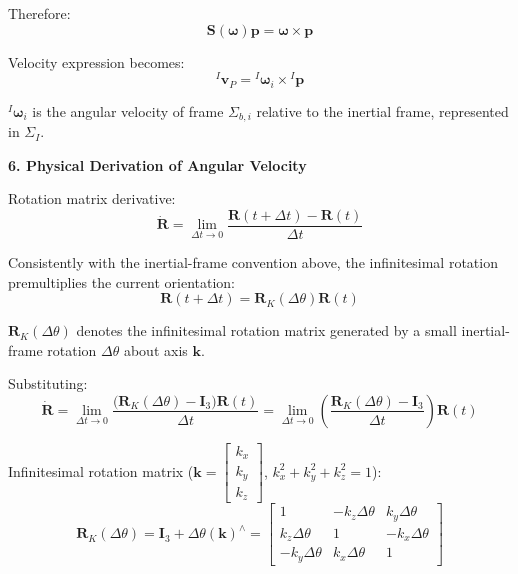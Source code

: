 \documentclass[12pt,a4paper]{report}
\newcommand{\newsymbols}[1]{\par\noindent{}#1\par\vspace{0.35em}}
\newcommand{\vect}[1]{\mathbf{#1}}
\newcommand{\mat}[1]{\mathbf{#1}}
\newcommand{\Frame}[1]{\Sigma_{#1}}
\newcommand{\skewmat}[1]{\left(#1\right)^\wedge}
\newcommand{\angvel}{\boldsymbol{\omega}}
\begin{document}
Therefore:
\begin{equation}
\mat{S}(\angvel)\vect{p} = \angvel \times \vect{p}
\end{equation}

Velocity expression becomes:
\begin{equation}
{}^{I}\vect{v}_{P}
=
{}^{I}\angvel_{i} \times {}^{I}\vect{p}
\end{equation}
\newsymbols{${}^{I}\angvel_{i}$ is the angular velocity of frame $\Frame{b,i}$ relative to the inertial frame, represented in $\Frame{I}$.}

\textbf{6. Physical Derivation of Angular Velocity}

Rotation matrix derivative:
\begin{equation}
\dot{\mat{R}}
=
\lim_{\Delta t \to 0}
\frac{\mat{R}(t+\Delta t) - \mat{R}(t)}{\Delta t}
\end{equation}

Consistently with the inertial-frame convention above, the infinitesimal rotation premultiplies the current orientation:
\begin{equation}
\mat{R}(t+\Delta t) = \mat{R}_{K}(\Delta\theta)\mat{R}(t)
\end{equation}
\newsymbols{$\mat{R}_{K}(\Delta\theta)$ denotes the infinitesimal rotation matrix generated by a small inertial-frame rotation $\Delta\theta$ about axis $\vect{k}$.}

Substituting:
\begin{equation}
\dot{\mat{R}}
=
\lim_{\Delta t \to 0}
\frac{\bigl(\mat{R}_{K}(\Delta\theta) - \mat{I}_{3}\bigr)\mat{R}(t)}{\Delta t}
=
\lim_{\Delta t \to 0}
\left(
\frac{\mat{R}_{K}(\Delta\theta) - \mat{I}_{3}}{\Delta t}
\right)\mat{R}(t)
\end{equation}

Infinitesimal rotation matrix ($\vect{k} = \begin{bmatrix} k_{x} \\ k_{y} \\ k_{z} \end{bmatrix}$, $k_{x}^{2} + k_{y}^{2} + k_{z}^{2} = 1$):
\begin{equation}
\mat{R}_{K}(\Delta\theta)
=
\mat{I}_{3} + \Delta\theta \skewmat{\vect{k}}
=
\begin{bmatrix}
1 & -k_{z}\Delta\theta & k_{y}\Delta\theta \\
k_{z}\Delta\theta & 1 & -k_{x}\Delta\theta \\
-k_{y}\Delta\theta & k_{x}\Delta\theta & 1
\end{bmatrix}
\end{equation}
\end{document}
